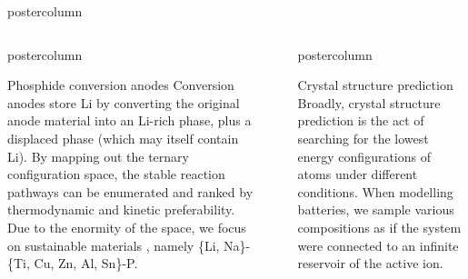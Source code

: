 \documentclass{beamer}
\newlength{\columnheight}
\begin{document}
\begin{frame}
\begin{columns}
\begin{column}{.65\textwidth}
\begin{beamercolorbox}[center]{postercolumn}
\begin{minipage}{.98\textwidth}
{\begin{columns}
\begin{column}{.48\textwidth}
\begin{beamercolorbox}[left]{postercolumn}
\begin{minipage}{\textwidth}
{\begin{myblock}{Phosphide conversion anodes}
          Conversion anodes store Li by converting the original anode material into an Li-rich phase, plus a displaced phase (which may itself contain Li). By mapping out the ternary configuration space, the stable reaction pathways can be enumerated and ranked by thermodynamic and kinetic preferability. Due to the enormity of the space, we focus on sustainable materials \cite{Grey2016}, namely \{Li, Na\}-\{Ti, Cu, Zn, Al, Sn\}-P.
      \end{myblock}\vfill
		}\end{minipage}\end{beamercolorbox}
	\end{column}
  \begin{column}{.00\textwidth}
    \end{column}
  \begin{column}{.48\textwidth}
		\begin{beamercolorbox}[right]{postercolumn}
			\begin{minipage}{\textwidth} %
				\parbox[t][\columnheight]{\textwidth}{ %
					\begin{myblock}{Crystal structure prediction}
              Broadly, crystal structure prediction is the act of searching for the lowest energy configurations of atoms under different conditions. When modelling batteries, we sample various compositions as if the system were connected to an infinite reservoir of the active ion.
              

\end{myblock}}
\end{minipage}
\end{beamercolorbox}
\end{column}
\end{columns}}
\end{minipage}
\end{beamercolorbox}
\end{column}
\end{columns}
\end{frame}
\end{document}

